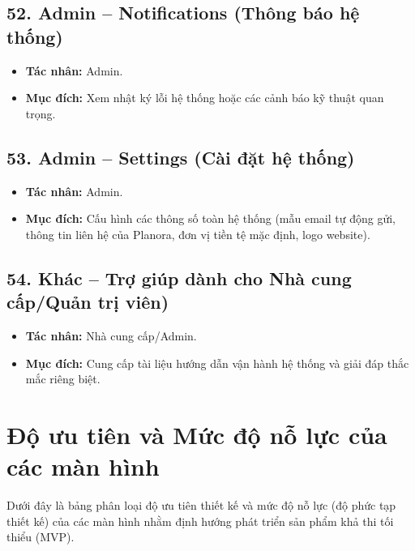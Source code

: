 \documentclass[11pt,a4paper]{article}
\begin{document}
\subsection{52. Admin – Notifications (Thông báo hệ thống)}
\begin{itemize}
    \item \textbf{Tác nhân:} Admin.
    \item \textbf{Mục đích:} Xem nhật ký lỗi hệ thống hoặc các cảnh báo kỹ thuật quan trọng.
\end{itemize}

\subsection{53. Admin – Settings (Cài đặt hệ thống)}
\begin{itemize}
    \item \textbf{Tác nhân:} Admin.
    \item \textbf{Mục đích:} Cấu hình các thông số toàn hệ thống (mẫu email tự động gửi, thông tin liên hệ của Planora, đơn vị tiền tệ mặc định, logo website).
\end{itemize}

\subsection{54. Khác – Trợ giúp dành cho Nhà cung cấp/Quản trị viên)}
\begin{itemize}
    \item \textbf{Tác nhân:} Nhà cung cấp/Admin.
    \item \textbf{Mục đích:} Cung cấp tài liệu hướng dẫn vận hành hệ thống và giải đáp thắc mắc riêng biệt.
\end{itemize}

\section{Độ ưu tiên và Mức độ nỗ lực của các màn hình}
Dưới đây là bảng phân loại độ ưu tiên thiết kế và mức độ nỗ lực (độ phức tạp thiết kế) của các màn hình nhằm định hướng phát triển sản phẩm khả thi tối thiểu (MVP).
\end{document}
